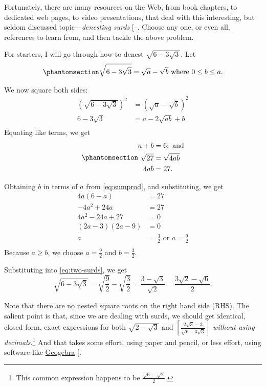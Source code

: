 \documentclass[
  a4paper,
]{article}
\begin{document}
Fortunately, there are many resources on the Web, from book chapters, to
dedicated web pages, to video presentations, that deal with this
interesting, but seldom discussed topic---\emph{denesting surds}
{[}--\citeproc{ref-ds-yt-method}{9}{]}.
Choose any one, or even all, references to learn from, and then tackle
the above problem.

For starters, I will go through how to denest \(\sqrt{6-3\sqrt{3}}\).
Let \begin{equation}\phantomsection\label{eq:two-surds}{
\sqrt{6-3\sqrt{3}} = \sqrt{a} - \sqrt{b} \mbox{ where } 0 \leq b \leq a.
}\end{equation}

We now square both sides: \[
\begin{aligned}
\left(\sqrt{6-3\sqrt{3}}\right)^2 &= \left(\sqrt{a} - \sqrt{b}\right)^2\\
6 - 3\sqrt{3} &= a - 2\sqrt{ab} + b\\
\end{aligned}
\] Equating like terms, we get
\begin{equation}\phantomsection\label{eq:sumprod}{
\begin{aligned}
a + b &= 6; \mbox{ and}\\
\sqrt{27} &= \sqrt{4ab}\\
4ab &= 27.
\end{aligned}
}\end{equation}

Obtaining \(b\) in terms of \(a\) from \cref{eq:sumprod}, and
substituting, we get \[
\begin{aligned}
4a(6-a) &= 27\\
-4a^2 + 24a &= 27\\
4a^2 -24a +27 &= 0\\
(2a - 3)(2a - 9) &=0\\
a &= \tfrac{3}{2} \mbox{ or } a = \tfrac{9}{2}\\
\end{aligned}
\] Because \(a \geq b\), we choose \(a = \frac{9}{2}\) and
\(b = \frac{3}{2}\).

Substituting into \cref{eq:two-surds}, we get \[
\sqrt{6-3\sqrt{3}} = \sqrt{\frac{9}{2}} - \sqrt{\frac{3}{2}} = \frac{3 - \sqrt{3}}{\sqrt{2}} = \frac{3\sqrt{2} - \sqrt{6}}{2}.
\]

Note that there are no nested square roots on the right hand side (RHS).
The salient point is that, since we are dealing with surds, we should
get identical, closed form, exact expressions for both
\(\sqrt{2 - \sqrt{3}}\) and
\(\left[\frac{2\sqrt{3} - 3}{\sqrt{6 - 3\sqrt{3}}}\right]\)
\emph{without using decimals}.\footnote{This common expression happens
  to be \(\frac{\sqrt{6} - \sqrt{2}}{2}\).} And that takes some effort,
using paper and pencil, or less effort, using software like
\href{https://www.geogebra.org/}{Geogebra}
{[}\citeproc{ref-geogebra}{10}{]}.
\end{document}
